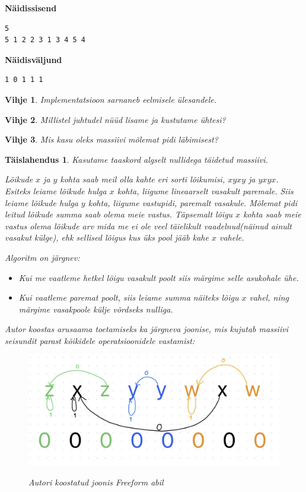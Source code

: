 \documentclass{trkut}
\newtheorem*{vihje}{Vihje}
\newtheorem*{solution}{Täislahendus}
\begin{document}
\textbf{Näidissisend}

\begin{verbatim}
5
5 1 2 2 3 1 3 4 5 4
\end{verbatim}

\textbf{Näidisväljund}

\begin{verbatim}
1 0 1 1 1 
\end{verbatim}


\begin{vihje}
Implementatsioon sarnaneb eelmisele ülesandele.
\end{vihje}

\begin{vihje}
Millistel juhtudel nüüd lisame ja kustutame ühtesi?
\end{vihje}

\begin{vihje}
Mis kasu oleks massiivi mõlemat pidi läbimisest?
\end{vihje}
\begin{solution}
Kasutame taaskord algselt nullidega täidetud massiivi.

Lõikude $x$ ja $y$ kohta saab meil olla kahte eri sorti lõikumisi, $xyxy$ ja $yxyx$.
Esiteks leiame lõikude hulga $x$ kohta, liigume lineaarselt vasakult paremale.
Siis leiame lõikude hulga $y$ kohta, liigume vastupidi, paremalt vasakule.
Mõlemat pidi leitud lõikude summa saab olema meie vastus.
Täpsemalt lõigu $x$ kohta saab meie vastus olema lõikude arv mida me ei ole veel täielikult vaadelnud(näinud ainult vasakut külge), ehk sellised lõigus kus üks pool jääb kahe $x$ vahele.

Algoritm on järgnev:
\begin{itemize}
\item Kui me vaatleme hetkel lõigu vasakult poolt siis märgime selle asukohale ühe.
\item Kui vaatleme paremat poolt, siis leiame summa näiteks lõigu $x$ vahel, ning märgime vasakpoole külje võrdseks nulliga.
\end{itemize}

Autor koostas arusaama toetamiseks ka järgneva joonise, mis kujutab massiivi seisundit parast kõikidele operatsioonidele vastamist:
\begin{figure}[H]%
    \includegraphics[width=12cm]{intersecting.jpeg}%
    \caption{Autori koostatud joonis Freeform abil}%
    \allikas{}%
    \label{joonis}%
\end{figure}

\end{solution}
\end{document}
